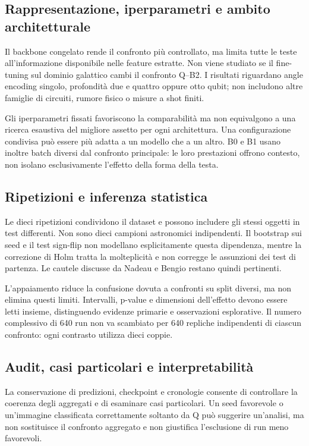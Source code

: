 \subsection{Rappresentazione, iperparametri e ambito architetturale}

Il backbone congelato rende il confronto più controllato, ma limita tutte le teste
all'informazione disponibile nelle feature estratte. Non viene studiato
se il fine-tuning sul dominio galattico cambi il confronto Q--B2.
I risultati riguardano angle encoding singolo, profondità due e
quattro oppure otto qubit; non includono altre famiglie di circuiti,
rumore fisico o misure a shot finiti.

Gli iperparametri fissati favoriscono la comparabilità ma non equivalgono
a una ricerca esaustiva del migliore assetto per ogni architettura.
Una configurazione condivisa può essere più adatta a un modello
che a un altro. B0 e B1 usano inoltre batch diversi dal confronto
principale: le loro prestazioni offrono contesto, non isolano
esclusivamente l'effetto della forma della testa.

\subsection{Ripetizioni e inferenza statistica}

Le dieci ripetizioni condividono il dataset e possono includere
gli stessi oggetti in test differenti. Non sono dieci campioni
astronomici indipendenti. Il bootstrap sui seed e il test sign-flip
non modellano esplicitamente questa dipendenza, mentre la correzione
di Holm tratta la molteplicità e non corregge le assunzioni dei test
di partenza. Le cautele discusse da Nadeau e Bengio
\cite{nadeau2003inference} restano quindi pertinenti.

L'appaiamento riduce la confusione dovuta a confronti su split
diversi, ma non elimina questi limiti. Intervalli, p-value e
dimensioni dell'effetto devono essere letti insieme, distinguendo
evidenze primarie e osservazioni esplorative. Il numero complessivo
di 640 run non va scambiato per 640 repliche indipendenti di
ciascun confronto: ogni contrasto utilizza dieci coppie.

\subsection{Audit, casi particolari e interpretabilità}

La conservazione di predizioni, checkpoint e cronologie consente
di controllare la coerenza degli aggregati e di esaminare casi
particolari. Un seed favorevole o un'immagine classificata
correttamente soltanto da Q può suggerire un'analisi, ma non
sostituisce il confronto aggregato e non giustifica l'esclusione
di run meno favorevoli.

